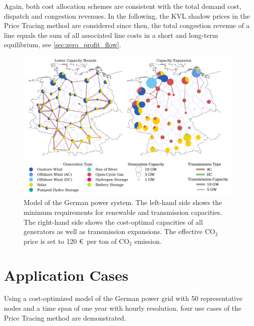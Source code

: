 \documentclass[11pt,twocolumn]{article}
\begin{document}
Again, both cost allocation schemes are consistent with the total demand cost, dispatch and congestion revenues. In the following, the \ac{KVL} shadow prices in the Price Tracing method are considered since then, the total congestion revenue of a line equals the sum of all associated line costs in a short and long-term equilibrium, see \cref{sec:zero_profit_flow}.

\begin{figure}[h!]
    \centering
    \includegraphics[width=\linewidth]{de50/network}
    \caption{Model of the German power system. The left-hand side shows the minimum requirements for renewable and transmission capacities. The right-hand side shows the cost-optimal capacities of all generators as well as transmission expansions. The effective CO$_2$ price is set to 120 \euro\, per ton of CO$_2$ emission.}
    \label{fig:network}
\end{figure}


\section{Application Cases}
\label{sec:application_case}

Using a cost-optimized model of the German power grid with 50 representative nodes and a time span of one year with hourly resolution, four use cases of the Price Tracing method are demonstrated.
\end{document}
